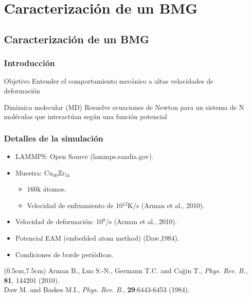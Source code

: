 
\section[Caracterizaci\'on]{Caracterizaci\'on de un BMG}
\subsection{Caracterizaci\'on de un BMG}

\begin{frame}
    \frametitle{Introducci\'on}
    \vspace{0.2cm}
    \begin{block}{Objetivo}
     Entender el comportamiento mec\'anico a altas velocidades de deformaci\'on
    \end{block}
    \begin{block}{Din\'amica molecular (MD)}
    Resuelve ecuaciones de Newton para un sistema de N mol\'eculas que interact\'uan seg\'un una funci\'on potencial
    \end{block}
\end{frame}

\begin{frame}
    \frametitle{Detalles de la simulaci\'on}
    \vspace{0.2cm}
    \begin{itemize}
        \item LAMMPS: Open Source (lammps.sandia.gov).
        \item Muestra: Cu$_{46}$Zr$_{54}$
        \begin{itemize}
	  \item 160k \'atomos.
	  \item Velocidad de enfriamiento de 10$^{12}$K/s (Arman et al., 2010).
        \end{itemize}
	\item Velocidad de deformaci\'on: 10$^9$/s (Arman et al., 2010).
	\item Potencial EAM (embedded atom method) (Daw,1984).
	\item Condiciones de borde peri\'odicas.
    \end{itemize}
    \begin{textblock*}{12cm}(0.5cm,7.5cm) %
        \scriptsize{Arman B., Luo S.-N., Germann T.C. and Cağin T., \textit{Phys. Rev. B.}, \textbf{81}, 144201 (2010).\\
        Daw M. and Baskes M.I., \textit{Phys. Rev. B.}, \textbf{29}:6443-6453 (1984).}
    \end{textblock*}
\end{frame}

